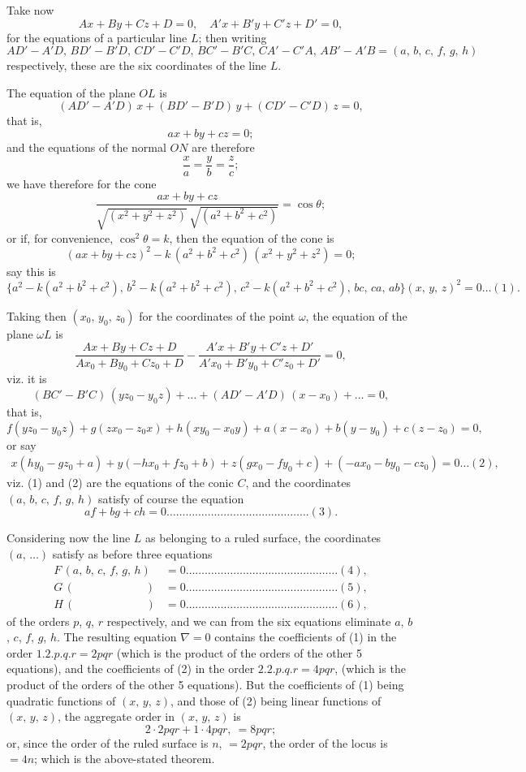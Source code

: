 \documentclass[11pt,a4paper]{book}
\begin{document}
Take now
\[
Ax + By + Cz + D = 0,\quad A'x + B'y + C'z + D' = 0,
\]
for the equations of a particular line $L$; then writing
\[
AD'-A'D,\, BD'-B'D,\, CD'-C'D,\, BC'-B'C,\, CA'-C'A,\, AB'-A'B = (a,\,b,\,c,\,f,\,g,\,h)
\]
respectively, these are the six coordinates of the line $L$.

The equation of the plane $OL$ is
\[
(AD'-A'D)\,x + (BD'-B'D)\,y + (CD'-C'D)\,z = 0,
\]
that is,
\[
ax + by + cz = 0;
\]
and the equations of the normal $ON$ are therefore
\[
\frac{x}{a} = \frac{y}{b} = \frac{z}{c};
\]
we have therefore for the cone
\[
\frac{ax+by+cz}{\sqrt{(x^2+y^2+z^2)}\,\sqrt{(a^2+b^2+c^2)}} = \cos\theta;
\]
or if, for convenience, $\cos^2\theta = k$, then the equation of the cone is
\[
(ax+by+cz)^2 - k\,(a^2+b^2+c^2)\,(x^2+y^2+z^2) = 0;
\]
say this is
\[
\{a^2-k(a^2+b^2+c^2),\, b^2-k(a^2+b^2+c^2),\, c^2-k(a^2+b^2+c^2),\, bc,\, ca,\, ab\}(x,\,y,\,z)^2 = 0\ldots(1).
\]

Taking then $(x_0,\,y_0,\,z_0)$ for the coordinates of the point $\omega$, the equation of the plane $\omega L$ is
\[
\frac{Ax+By+Cz+D}{Ax_0+By_0+Cz_0+D} - \frac{A'x+B'y+C'z+D'}{A'x_0+B'y_0+C'z_0+D'} = 0,
\]
viz. it is
\[
(BC'-B'C)\,(yz_0-y_0z) + \ldots + (AD'-A'D)\,(x-x_0) + \ldots = 0,
\]
that is,
\[
f(yz_0-y_0z) + g(zx_0-z_0x) + h(xy_0-x_0y) + a(x-x_0) + b(y-y_0) + c(z-z_0) = 0,
\]
or say
\begin{multline*}
x(hy_0-gz_0+a) + y(-hx_0+fz_0+b) + z(gx_0-fy_0+c) + (-ax_0-by_0-cz_0) = 0\ldots(2),
\end{multline*}
viz. (1) and (2) are the equations of the conic $C$, and the coordinates $(a,\,b,\,c,\,f,\,g,\,h)$ satisfy of course the equation
\[
af + bg + ch = 0\ldots\ldots\ldots\ldots\ldots\ldots\ldots\ldots\ldots\ldots\ldots\ldots\ldots\ldots\ldots(3).
\]

Considering now the line $L$ as belonging to a ruled surface, the coordinates $(a,\,\ldots)$ satisfy as before three equations
\begin{align*}
F\,(a,\,b,\,c,\,f,\,g,\,h) &= 0\ldots\ldots\ldots\ldots\ldots\ldots\ldots\ldots\ldots\ldots\ldots\ldots\ldots\ldots\ldots\ldots(4),\\
G\,(\phantom{a,\,b,\,c,\,}\quad\quad\quad) &= 0\ldots\ldots\ldots\ldots\ldots\ldots\ldots\ldots\ldots\ldots\ldots\ldots\ldots\ldots\ldots\ldots(5),\\
H\,(\phantom{a,\,b,\,c,\,}\quad\quad\quad) &= 0\ldots\ldots\ldots\ldots\ldots\ldots\ldots\ldots\ldots\ldots\ldots\ldots\ldots\ldots\ldots\ldots(6),
\end{align*}
of the orders $p$, $q$, $r$ respectively, and we can from the six equations eliminate $a$, $b$, $c$, $f$, $g$, $h$. The resulting equation $\nabla=0$ contains the coefficients of (1) in the order $1.2.p.q.r = 2pqr$ (which is the product of the orders of the other 5 equations), and the coefficients of (2) in the order $2.2.p.q.r = 4pqr$, (which is the product of the orders of the other 5 equations). But the coefficients of (1) being quadratic functions of $(x,\,y,\,z)$, and those of (2) being linear functions of $(x,\,y,\,z)$, the aggregate order in $(x,\,y,\,z)$ is
\[
2\cdot 2pqr + 1\cdot 4pqr,\ = 8pqr;
\]
or, since the order of the ruled surface is $n$, $= 2pqr$, the order of the locus is $= 4n$; which is the above-stated theorem.
\end{document}
